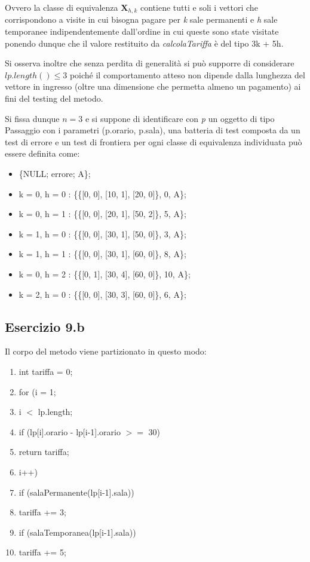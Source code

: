 \documentclass[10pt, italian, openany, landscape]{book}
\begin{document}
Ovvero la classe di equivalenza \(\mathbf{X}_{h, k}\) contiene tutti e soli i vettori che corrispondono a visite in cui bisogna pagare per
\textit{k} sale permanenti e \textit{h} sale temporanee indipendentemente dall'ordine in cui queste sono state visitate ponendo dunque che
il valore restituito da \textit{calcolaTariffa} \`e del tipo 3k + 5h.

Si osserva inoltre che senza perdita di generalit\`a si pu\`o supporre di considerare \(lp.length() \leq 3\) poich\'e il comportamento atteso
non dipende dalla lunghezza del vettore in ingresso (oltre una dimensione che permetta almeno un pagamento) ai fini del testing del metodo.

Si fissa dunque \(n = 3\) e si suppone di identificare con \textit{p} un oggetto di tipo Passaggio con i parametri (p.orario, p.sala),
una batteria di test composta da un test di errore e un test di frontiera per ogni classe di equivalenza individuata pu\`o essere definita come:
\begin{itemize}
    \item \{NULL; errore; A\};
    \item k = 0, h = 0 : \{\{[0, 0], [10, 1], [20, 0]\}, 0, A\};
    \item k = 0, h = 1 : \{\{[0, 0], [20, 1], [50, 2]\}, 5, A\};
    \item k = 1, h = 0 : \{\{[0, 0], [30, 1], [50, 0]\}, 3, A\};
    \item k = 1, h = 1 : \{\{[0, 0], [30, 1], [60, 0]\}, 8, A\};
    \item k = 0, h = 2 : \{\{[0, 1], [30, 4], [60, 0]\}, 10, A\};
    \item k = 2, h = 0 : \{\{[0, 0], [30, 3], [60, 0]\}, 6, A\};
\end{itemize}

\subsection{Esercizio 9.b}
Il corpo del metodo viene partizionato in questo modo:
\begin{enumerate}
    \item int tariffa = 0;
    \item for (i = 1;
    \item i \(<\) lp.length;
    \item if (lp[i].orario - lp[i-1].orario \(>=\) 30)
    \item return tariffa;
    \item i++)
    \item if (salaPermanente(lp[i-1].sala))
    \item tariffa += 3;
    \item if (salaTemporanea(lp[i-1].sala))
    \item tariffa += 5;
\end{enumerate}
\pagebreak
\end{document}
